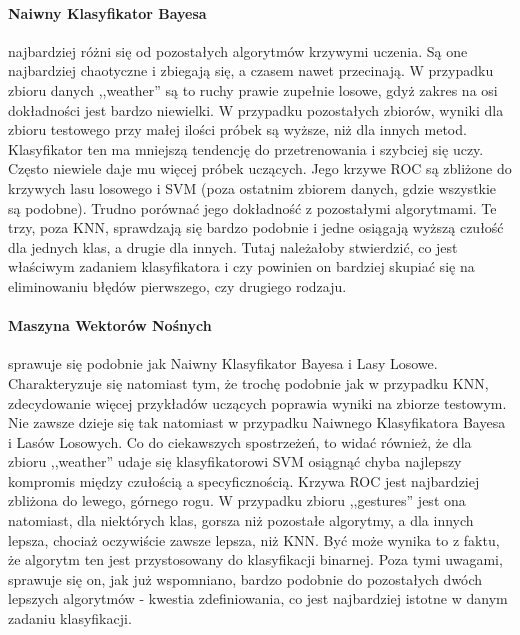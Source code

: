 \documentclass{classrep}
\begin{document}
{{            \paragraph{Naiwny Klasyfikator Bayesa} najbardziej różni się od pozostałych
            algorytmów krzywymi uczenia. Są one najbardziej chaotyczne i zbiegają się,
            a czasem nawet przecinają. W przypadku zbioru danych ,,weather'' są to
            ruchy prawie zupełnie losowe, gdyż zakres na osi dokładności jest bardzo
            niewielki. W przypadku pozostałych zbiorów, wyniki dla zbioru testowego
            przy małej ilości próbek są wyższe, niż dla innych metod. Klasyfikator ten
            ma mniejszą tendencję do przetrenowania i szybciej się uczy. Często
            niewiele daje mu więcej próbek uczących. Jego krzywe ROC są zbliżone do
            krzywych lasu losowego i SVM (poza ostatnim zbiorem danych, gdzie wszystkie
            są podobne). Trudno porównać jego dokładność z pozostałymi algorytmami. Te
            trzy, poza KNN, sprawdzają się bardzo podobnie i jedne osiągają wyższą
            czułość dla jednych klas, a drugie dla innych. Tutaj należałoby stwierdzić,
            co jest właściwym zadaniem klasyfikatora i czy powinien on bardziej skupiać
            się na eliminowaniu błędów pierwszego, czy drugiego rodzaju.

            \paragraph{Maszyna Wektorów Nośnych} sprawuje się podobnie jak Naiwny
            Klasyfikator Bayesa i Lasy Losowe. Charakteryzuje się natomiast tym, że
            trochę podobnie jak w przypadku KNN, zdecydowanie więcej przykładów
            uczących poprawia wyniki na zbiorze testowym. Nie zawsze dzieje się tak
            natomiast w przypadku Naiwnego Klasyfikatora Bayesa i Lasów Losowych. Co do
            ciekawszych spostrzeżeń, to widać również, że dla zbioru ,,weather'' udaje
            się klasyfikatorowi SVM osiągnąć chyba najlepszy kompromis między czułością
            a specyficznością. Krzywa ROC jest najbardziej zbliżona do lewego, górnego
            rogu. W przypadku zbioru ,,gestures'' jest ona natomiast, dla niektórych
            klas, gorsza niż pozostałe algorytmy, a dla innych lepsza, chociaż
            oczywiście zawsze lepsza, niż KNN. Być może wynika to z faktu, że algorytm
            ten jest przystosowany do klasyfikacji binarnej. Poza tymi uwagami,
            sprawuje się on, jak już wspomniano, bardzo podobnie do pozostałych dwóch
            lepszych algorytmów - kwestia zdefiniowania, co jest najbardziej istotne w
            danym zadaniu klasyfikacji.

}}
\end{document}
